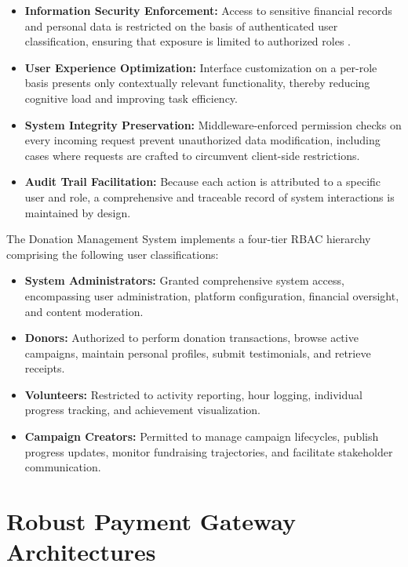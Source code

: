 \documentclass{thesis-library}
\begin{document}
\begin{itemize}
    \item \textbf{Information Security Enforcement:} Access to sensitive financial records and personal data is restricted on the basis of authenticated user classification, ensuring that exposure is limited to authorized roles \cite{iso27001security}.
    \item \textbf{User Experience Optimization:} Interface customization on a per-role basis presents only contextually relevant functionality, thereby reducing cognitive load and improving task efficiency.
    \item \textbf{System Integrity Preservation:} Middleware-enforced permission checks on every incoming request prevent unauthorized data modification, including cases where requests are crafted to circumvent client-side restrictions.
    \item \textbf{Audit Trail Facilitation:} Because each action is attributed to a specific user and role, a comprehensive and traceable record of system interactions is maintained by design.
\end{itemize}

The Donation Management System implements a four-tier RBAC hierarchy comprising the following user classifications:

\begin{itemize}
    \item \textbf{System Administrators:} Granted comprehensive system access, encompassing user administration, platform configuration, financial oversight, and content moderation.
    \item \textbf{Donors:} Authorized to perform donation transactions, browse active campaigns, maintain personal profiles, submit testimonials, and retrieve receipts.
    \item \textbf{Volunteers:} Restricted to activity reporting, hour logging, individual progress tracking, and achievement visualization.
    \item \textbf{Campaign Creators:} Permitted to manage campaign lifecycles, publish progress updates, monitor fundraising trajectories, and facilitate stakeholder communication.
\end{itemize}

\section{Robust Payment Gateway Architectures}
\end{document}

